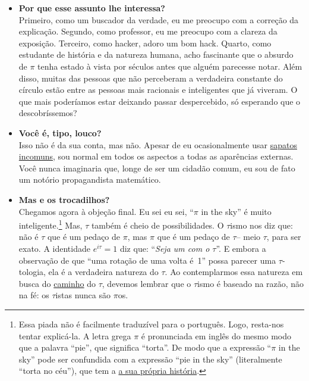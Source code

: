 {\begin{itemize}
  \item \textbf{Por que esse assunto lhe interessa?} \\ Primeiro, como um buscador da verdade, eu me preocupo com a correção da explicação. Segundo, como professor, eu me preocupo com a clareza da exposição. Terceiro, como hacker, adoro um bom hack. Quarto, como estudante de história e da natureza humana, acho fascinante que o absurdo de $\pi$ tenha estado à vista por séculos antes que alguém parecesse notar. Além disso, muitas das pessoas que não perceberam a verdadeira constante do círculo estão entre as pessoas mais racionais e inteligentes que já viveram. O que mais poderíamos estar deixando passar despercebido, só esperando que o descobríssemos?

  \item \textbf{Você é, tipo, louco?} \\ Isso não é da sua conta, mas não. Apesar de eu ocasionalmente usar \href{https://en.wikipedia.org/wiki/Vibram_FiveFingers}{sapatos incomuns}, sou normal em todos os aspectos a todas as aparências externas. Você nunca imaginaria que, longe de ser um cidadão comum, eu sou de fato um notório propagandista matemático.

  \item \textbf{Mas e os trocadilhos?} \\ Chegamos agora à objeção final. Eu sei eu sei, ``$\pi$ in the sky'' é muito inteligente.\footnote{Essa piada não é facilmente traduzível para o português. Logo, resta-nos tentar explicá-la. A letra grega $\pi$ é pronunciada em inglês do mesmo modo que a palavra ``pie'', que significa ``torta''. De modo que a expressão ``$\pi$ in the sky'' pode ser confundida com a expressão ``pie in the sky'' (literalmente ``torta no céu''), que tem a \href{https://en.wiktionary.org/wiki/pie_in_the_sky}{a sua própria história}.} Mas, $\tau$ também é cheio de possibilidades. O $\tau$ismo nos diz que: não é $\tau$ que é um pedaço de $\pi$, mas $\pi$ que é um pedaço de $\tau$-- meio $\tau$, para ser exato. A identidade $e^{i\tau} = 1$ diz que: ``\emph{Seja um com o $\tau$}''. E embora a observação de que ``uma rotação de uma volta é~1'' possa parecer uma $\tau$-tologia, ela é a verdadeira natureza do $\tau$. Ao contemplarmos essa natureza em busca do \href{https://pt.wikipedia.org/wiki/Tao}{caminho} do $\tau$, devemos lembrar que o $\tau$ismo é baseado na razão, não na fé: os $\tau$istas nunca são $\pi$os.

\end{itemize}

}
